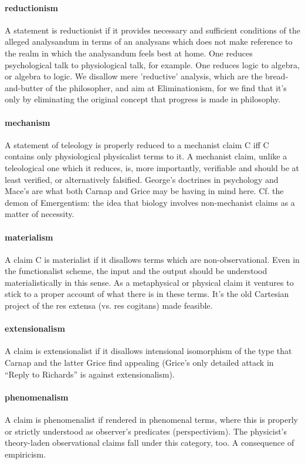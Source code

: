 \documentclass[10pt,titlepage]{book}
\begin{document}
\paragraph{reductionism} A statement is reductionist if it provides necessary and  
sufficient conditions of the alleged analysandum in terms of an analysans which 
 does not make reference to the realm in which the analysandum feels best at 
home.  One reduces psychological talk to physiological talk, for example. 
One reduces  logic to algebra, or algebra to logic. We disallow mere 
'reductive' analysis,  which are the bread-and-butter of the philosopher, and aim at 
Eliminationism,  for we find that it's only by eliminating the original 
concept that progress is  made in philosophy.
 
\paragraph{mechanism} A statement of teleology is properly reduced to a mechanist  
claim C iff C contains only physiological physicalist terms to it. A mechanist  
claim, unlike a teleological one which it reduces, is, more importantly,  
verifiable and should be at least verified, or alternatively falsified. 
George's  doctrines in psychology and Mace's are what both Carnap and Grice may 
be having  in mind here. Cf. the demon of Emergentism: the idea that biology 
involves  non-mechanist claims as a matter of necessity.
 
\paragraph{materialism} A claim C is materialist if it disallows terms which are  
non-observational. Even in the functionalist scheme, the input and the output  
should be understood materialistically in this sense. As a metaphysical or  
physical claim it ventures to stick to a proper account of what there is in  
these terms. It's the old Cartesian project of the res extensa (vs. res  
cogitans) made feasible.
 
\paragraph{extensionalism} A claim is extensionalist if it disallows intensional  
isomorphism of the type that Carnap and the latter Grice find appealing (Grice's 
 only detailed attack in ``Reply to Richards'' is against extensionalism).
 
\paragraph{phenomenalism} A claim is phenomenalist if rendered in phenomenal terms,  
where this is properly or strictly understood as observer's predicates  
(perspectivism). The physicist's theory-laden observational claims fall under  
this category, too. A consequence of empiricism.
 
\end{document}
